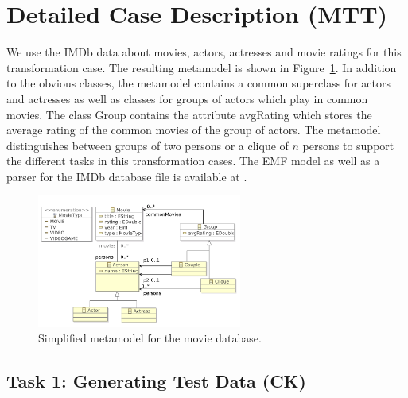 \documentclass[a4paper,11pt]{article}
\newcommand{\p}[1]{\textsf{\small #1}}
\begin{document}
\section{Detailed Case Description (MTT)}\label{sec-case}

We use the IMDb data about movies, actors, actresses and movie ratings for
this transformation case. The resulting metamodel is shown in
Figure~\ref{fig:metamodel}. In addition to the obvious classes, the
metamodel contains a common superclass for actors and actresses as
well as classes for groups of actors which play in common movies. The
class \p{Group} contains the attribute \p{avgRating} which stores the
average rating of the common movies of the group of actors. The
metamodel distinguishes between groups of two persons or a clique of
$n$ persons to support the different tasks in this transformation
cases.  The EMF model as well as a parser for the IMDb database file
is available at \cite{IMDB2EMF}.

\begin{figure}[ht]
\centering
\includegraphics[width=0.6\textwidth]{movies}
\caption{Simplified metamodel for the movie database.}
\label{fig:metamodel}
\end{figure}

\subsection{Task 1: Generating Test Data (CK)}
\label{sec:gen-test-data}

\end{document}
